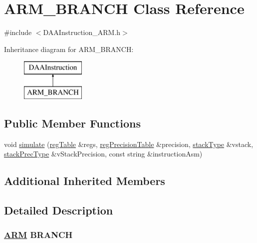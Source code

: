 \hypertarget{classARM__BRANCH}{}\section{A\+R\+M\+\_\+\+B\+R\+A\+N\+CH Class Reference}
\label{classARM__BRANCH}


{\ttfamily \#include $<$D\+A\+A\+Instruction\+\_\+\+A\+R\+M.\+h$>$}

Inheritance diagram for A\+R\+M\+\_\+\+B\+R\+A\+N\+CH\+:\begin{figure}[H]
\begin{center}
\leavevmode
\includegraphics[height=2.000000cm]{classARM__BRANCH}
\end{center}
\end{figure}
\subsection*{Public Member Functions}
\begin{DoxyCompactItemize}
\item 
void \hyperlink{classARM__BRANCH_aa0d9c3dd00b171810002e84021435ff1}{simulate} (\hyperlink{DAAInstruction_8h_af0fae93a861de9cf37988d5673cac523}{reg\+Table} \&regs, \hyperlink{DAAInstruction_8h_a0e8cae02815a5f8adc750122d790b455}{reg\+Precision\+Table} \&precision, \hyperlink{DAAInstruction_8h_a1b0e70ac1a04f06c8132055ed01f589f}{stack\+Type} \&vstack, \hyperlink{DAAInstruction_8h_ac5cb793e9dac3fa9693da78b7e29ab30}{stack\+Prec\+Type} \&v\+Stack\+Precision, const string \&instruction\+Asm)
\end{DoxyCompactItemize}
\subsection*{Additional Inherited Members}


\subsection{Detailed Description}


 \subsubsection*{\hyperlink{classARM}{A\+RM} B\+R\+A\+N\+CH }

